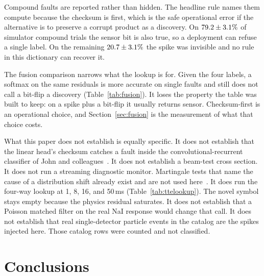 \documentclass[preprint,12pt]{elsarticle}
\begin{document}
Compound faults are reported rather than hidden. The headline rule names them compute because the checksum is first, which is the safe operational error if the alternative is to preserve a corrupt product as a discovery. On $79.2\pm3.1\%$ of simulator compound trials the sensor bit is also true, so a deployment can refuse a single label. On the remaining $20.7\pm3.1\%$ the spike was invisible and no rule in this dictionary can recover it.

The fusion comparison narrows what the lookup is for. Given the four labels, a softmax on the same residuals is more accurate on single faults and still does not call a bit-flip a discovery (Table~\ref{tab:fusion}). It loses the property the table was built to keep: on a spike plus a bit-flip it usually returns sensor. Checksum-first is an operational choice, and Section~\ref{sec:fusion} is the measurement of what that choice costs.

What this paper does not establish is equally specific. It does not establish that the linear head's checksum catches a fault inside the convolutional-recurrent classifier of John and colleagues~\cite{john2025}. It does not establish a beam-test cross section. It does not run a streaming diagnostic monitor. Martingale tests that name the cause of a distribution shift already exist and are not used here~\cite{hindy2025}. It does run the four-way lookup at 1, 8, 16, and 50\,ms (Table~\ref{tab:ttelookup}). The novel symbol stays empty because the physics residual saturates. It does not establish that a Poisson matched filter on the real NaI response would change that call. It does not establish that real single-detector particle events in the catalog are the spikes injected here. Those catalog rows were counted and not classified.

\section{Conclusions}
\end{document}
